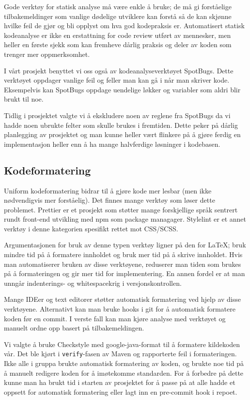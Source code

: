 \documentclass[12pt,a4paper]{article}
\begin{document}
Gode verktøy for statisk analyse må være enkle å bruke;
de må gi forståelige tilbakemeldinger som vanlige dødelige utviklere kan forstå
så de kan skjønne hvilke feil de gjør og bli opplyst om hva god kodepraksis er.
Automatisert statisk kodeanalyse
er ikke en erstattning for code review utført av mennesker,
men heller en første sjekk som kan fremheve dårlig praksis
og deler av koden som trenger mer oppmerksomhet.
\cite{staticCodeAnalysis}

I vårt prosjekt benyttet vi oss også av kodeanalyseverktøyet SpotBugs.
Dette verktøyet oppdager vanlige feil og feller man kan gå i når man
skriver kode. Eksempelvis kan SpotBugs oppdage uendelige løkker og
variabler som aldri blir brukt til noe.

Tidlig i prosjektet valgte vi å ekskludere noen av reglene fra SpotBugs
da vi hadde noen ubrukte felter som skulle brukes i fremtiden. Dette
peker på dårlig planlegging av prosjektet og man kunne heller vært
flinkere på å gjøre ferdig en implementasjon heller enn å ha mange
halvferdige løsninger i kodebasen.

\subsection*{Kodeformatering}

Uniform kodeformatering bidrar til å gjøre kode mer lesbar
(men ikke nødvendigvis mer forståelig).
Det finnes mange verktøy som løser dette problemet.
Prettier er et prosjekt som støtter mange forskjellige språk
sentrert rundt front-end utvikling med npm som package managager.
Stylelint er et annet verktøy i denne kategorien
spesifikt rettet mot CSS/SCSS.

Argumentasjonen for bruk av denne typen verktøy ligner på den for LaTeX;
bruk mindre tid på å formatere innholdet og bruk mer tid på å skrive
innholdet. Hvis man automatiserer bruken av disse verktøyene, reduserer
man tiden som brukes på å formateringen og gir mer tid for
implementering. En annen fordel er at man unngår indenterings- og
whitespacekrig i versjonskontrollen.

Mange IDEer og text editorer støtter automatisk formatering ved hjelp av
disse verktøyene. Alternativt kan man bruke hooks i git for å automatisk
formatere koden før en commit. I verste fall kan man kjøre analyse med
verktøyet og manuelt ordne opp basert på tilbakemeldingen.

Vi valgte å bruke Checkstyle med google-java-format til å formatere
kildekoden vår. Det ble kjørt i \texttt{verify}-fasen av Maven og
rapporterte feil i formateringen. Ikke alle i gruppa brukte automatisk
formatering av koden, og brukte noe tid på å manuelt redigere koden for
å imøtekomme standarden. For å forbedre på dette kunne man ha brukt tid
i starten av prosjektet for å passe på at alle hadde et oppsett for
automatisk formatering eller lagt inn en pre-commit hook i repoet.
\end{document}
